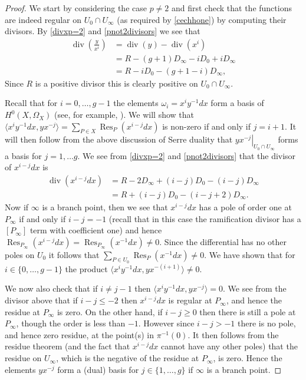 \documentclass[draft, 11pt]{article} %
\theoremstyle{plain}
\theoremstyle{remark}
\newcommand{\hzero}{{H^0(X,\Omega_X)}}
\DeclareMathOperator{\res}{Res}
\DeclareMathOperator{\di}{div}
\begin{document}
\begin{proof}
We start by considering the case $p \neq 2$ and first check that the functions are indeed regular on $U_0 \cap U_\infty$ (as required by \eqref{cechhone}) by computing their divisors.
By \eqref{divxp=2} and \eqref{pnot2divisors} we see that
\begin{align*}
\di \left( \frac{y}{x^i} \right) & = \di (y) - \di ( x^i) \\
& = R - (g+1)D_\infty - iD_0 + iD_\infty \\
& = R - iD_0 - (g+1 - i)D_\infty, 
\end{align*}
Since $R$ is a positive divisor this is clearly positive on $U_0 \cap U_\infty$.


Recall that for $i= 0, \ldots, g-1$ the elements $\omega_i = x^iy^{-1}dx$ form a basis of $\hzero$ (see, for example, \cite[Chap 7, Prop. 4.26]{liu}).
We will show that $\langle x^iy^{-1}dx, yx^{-j} \rangle = \sum_{P \in X}\res_P(x^{i-j}dx)$ is non-zero if and only if $j = i+1$.
It will then follow from the above discussion of Serre duality that $\left. yx^{-j}\right|_{U_0\cap U_\infty}$ forms a basis for $j=1, \ldots g$.
We see from \eqref{divxp=2} and \eqref{pnot2divisors} that the divisor of $x^{i-j}dx$ is
\begin{equation}\label{residuedivisor}
\begin{split}
\di(x^{i-j}dx) & = R - 2D_\infty +(i-j)D_0 - (i-j)D_\infty \\
& = R + (i-j)D_0 - (i-j+2)D_\infty.
\end{split}
\end{equation}
Now if $\infty$ is a branch point, then we see that $x^{i-j}dx$ has a pole of order one at $P_\infty$ if and only if $i-j = -1$ (recall that in this case the ramification divisor has a $[P_\infty]$ term with coefficient one) and hence $\res_{P_\infty}\left(x^{i-j}dx\right)  = \res_{P_\infty}\left(x^{-1}dx\right) \neq 0$.
Since the differential has no other poles on $U_0$ it follows that $\sum_{P \in U_0} \res_P(x^{-1}dx)  \neq 0$.
We have shown that for $i \in \{0, \ldots, g-1\}$ the product $\langle x^iy^{-1}dx, yx^{-(i+1)} \rangle \neq 0$.

We now also check that if $i \neq j-1$ then $\langle x^iy^{-1}dx, yx^{-j} \rangle = 0$.
We see from the divisor above that if $i-j \leq -2$ then $x^{i-j}dx$ is regular at $P_\infty$, and hence the residue at $P_\infty$ is zero.
On the other hand, if $i-j \geq 0$ then there is still a pole at $P_\infty$, though the order is less than $-1$.
However since $i-j > -1$ there is no pole, and hence zero residue, at the point(s) in $\pi^{-1}(0)$.
It then follows from the residue theorem (and the fact that $x^{i-j}dx$ cannot have any other poles) that the residue on $U_\infty$, which is the negative of the residue at $P_\infty$, is zero.
Hence the elements $yx^{-j}$ form a (dual) basis for $j \in \{1, \ldots , g\}$ if $\infty$ is a branch point.



\end{proof}
\end{document}
